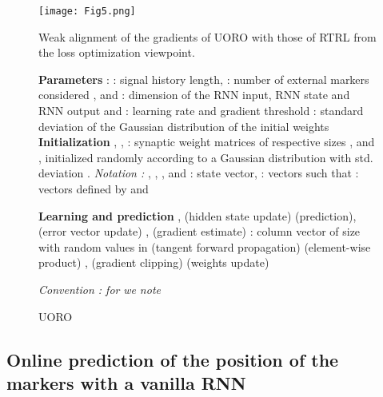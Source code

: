\documentclass[twocolumn,a4paper]{svjour3} \sloppy          \smartqed
\begin{document}
\begin{figure}[thb!]
\centering
\texttt{[image: Fig5.png]}
\caption[Weak alignment of the gradients of UORO with those of RTRL from the loss optimization viewpoint]{Weak alignment of the gradients of UORO with those of RTRL from the loss optimization viewpoint.\protect \footnotemark} \label{fig:UORO vs RTRL optimization point of view}
\end{figure}

\begin{figure*}[hbt!]
\centering
\begin{minipage}{.8\textwidth}
\begin{algorithm}[H]
\small
\caption{UORO}
\label{alg:RNN-UORO}
\begin{algorithmic}[1]
\State \textbf{Parameters} :
\State  : signal history length,  : number of external markers considered
\State ,  and  : dimension of the RNN input, RNN state and RNN output
\State  and  : learning rate and gradient threshold
\State  : standard deviation of the Gaussian distribution of the initial weights
\State 
\State
\State \textbf{Initialization}
\State , ,  : synaptic weight matrices of respective sizes ,  and , initialized randomly according to a Gaussian distribution with std. deviation . 
\State \textit{Notation :} , , , and 
\State  : state vector,  : vectors such that 
\State  : vectors defined by 
 and 

\State
\State \textbf{Learning and prediction}
\For{}
\State ,  (hidden state update)
\State  (prediction),  (error vector update)
\State 
\State ,  (gradient estimate)
\State  : column vector of size  with random values in 
\State  (tangent forward propagation)
\State  (element-wise product) \State 
\State 
\State 
\State , 
\quad 
\State  
\quad 
\State 
\If{} 
\State  (gradient clipping)
\EndIf 
\State  (weights update)
\State  
 
\State 
\EndFor
\State
\State \textit{Convention : for}  \textit{we note} 

\end{algorithmic}
\end{algorithm}

\end{minipage}

\end{figure*}


\subsection{Online prediction of the position of the markers with a vanilla RNN}
\end{document}
